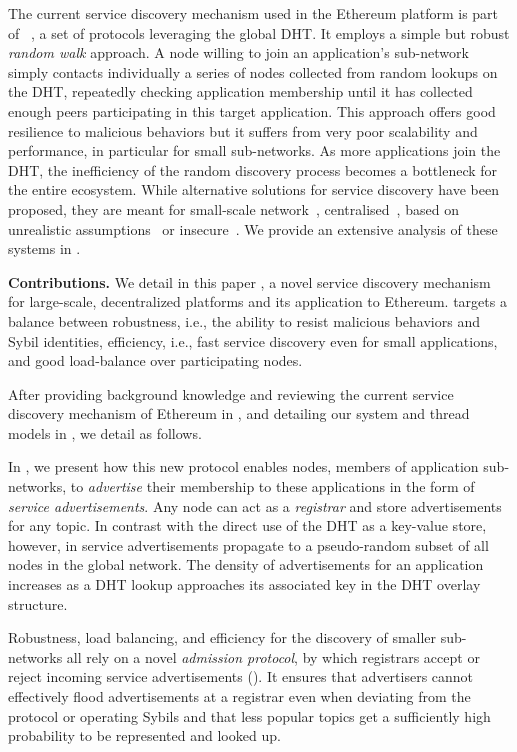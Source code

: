 The current service discovery mechanism used in the Ethereum platform is part of \discv~\cite{discv4}, a set of protocols leveraging the global DHT.
It employs a simple but robust \emph{random walk} approach.
A node willing to join an application's sub-network simply contacts individually a series of nodes collected from random lookups on the DHT, repeatedly checking application membership until it has collected enough peers participating in this target application.
This approach offers good resilience to malicious behaviors but it suffers from very poor scalability and performance, in particular for small sub-networks.
As more applications join the DHT, the inefficiency of the random discovery process becomes a bottleneck for the entire ecosystem. While alternative solutions for service discovery have been proposed, they are meant for small-scale network~\cite{zhang2002aggregate, helal2002standards}, centralised~\cite{RFC6763}, based on unrealistic assumptions~\cite{danezis2005sybil, danezis2009sybilinfer} or insecure~\cite{baldoni2007tera,scribe,poldercast,banno2015,scribe}. We provide an extensive analysis of these systems in .

\smallskip
\noindent
\textbf{Contributions.}
%
We detail in this paper \sysname, a novel service discovery mechanism for large-scale, decentralized platforms and its application to Ethereum.
\sysname targets a balance between robustness, i.e., the ability to resist malicious behaviors and Sybil identities, efficiency, i.e., fast service discovery even for small applications, and good load-balance over participating nodes.

After providing background knowledge and reviewing the current service discovery mechanism of Ethereum in , and detailing our system and thread models in , we detail \sysname as follows.

In , we present how this new protocol enables nodes, members of application sub-networks, to \emph{advertise} their membership to these applications in the form of \emph{service advertisements}.
Any node can act as a \emph{registrar} and store advertisements for any topic.
In contrast with the direct use of the DHT as a key-value store, however, in \sysname service advertisements propagate to a pseudo-random subset of all nodes in the global network.
The density of advertisements for an application increases as a DHT lookup approaches its associated key in the DHT overlay structure.

Robustness, load balancing, and efficiency for the discovery of smaller sub-networks all rely on a novel \emph{admission protocol}, by which registrars accept or reject incoming service advertisements ().
It ensures that advertisers cannot effectively flood advertisements at a registrar even when deviating from the protocol or operating Sybils and that less popular topics get a sufficiently high probability to be represented and looked up.

